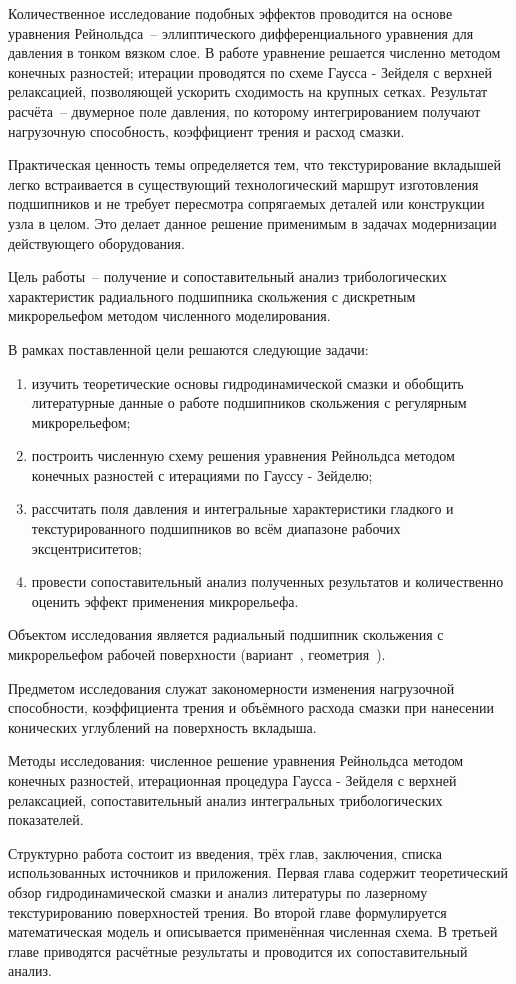 Количественное исследование подобных эффектов проводится на основе уравнения Рейнольдса~-- эллиптического дифференциального уравнения для давления в тонком вязком слое. В работе уравнение решается численно методом конечных разностей; итерации проводятся по схеме Гаусса - Зейделя с верхней релаксацией, позволяющей ускорить сходимость на крупных сетках. Результат расчёта~-- двумерное поле давления, по которому интегрированием получают нагрузочную способность, коэффициент трения и расход смазки.

Практическая ценность темы определяется тем, что текстурирование вкладышей легко встраивается в существующий технологический маршрут изготовления подшипников и не требует пересмотра сопрягаемых деталей или конструкции узла в целом. Это делает данное решение применимым в задачах модернизации действующего оборудования.

Цель работы~-- получение и сопоставительный анализ трибологических характеристик радиального подшипника скольжения с дискретным микрорельефом методом численного моделирования.

В рамках поставленной цели решаются следующие задачи:
\begin{enumerate}
    \item изучить теоретические основы гидродинамической смазки и обобщить литературные данные о работе подшипников скольжения с регулярным микрорельефом;
    \item построить численную схему решения уравнения Рейнольдса методом конечных разностей с итерациями по Гауссу - Зейделю;
    \item рассчитать поля давления и интегральные характеристики гладкого и текстурированного подшипников во всём диапазоне рабочих эксцентриситетов;
    \item провести сопоставительный анализ полученных результатов и количественно оценить эффект применения микрорельефа.
\end{enumerate}

Объектом исследования является радиальный подшипник скольжения с \varDimpleTypeGenitive{} микрорельефом рабочей поверхности (вариант~\varNumber, геометрия~\varGeomLetter).

Предметом исследования служат закономерности изменения нагрузочной способности, коэффициента трения и объёмного расхода смазки при нанесении конических углублений на поверхность вкладыша.

Методы исследования: численное решение уравнения Рейнольдса методом конечных разностей, итерационная процедура Гаусса - Зейделя с верхней релаксацией, сопоставительный анализ интегральных трибологических показателей.

Структурно работа состоит из введения, трёх глав, заключения, списка использованных источников и приложения. Первая глава содержит теоретический обзор гидродинамической смазки и анализ литературы по лазерному текстурированию поверхностей трения. Во второй главе формулируется математическая модель и описывается применённая численная схема. В третьей главе приводятся расчётные результаты и проводится их сопоставительный анализ.
